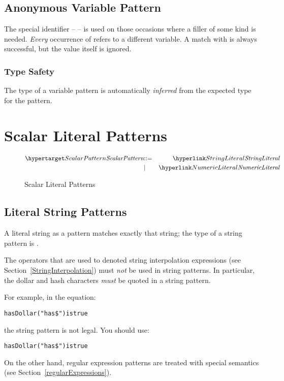 \subsection{Anonymous Variable Pattern}
\label{anonymousVariable}
The special identifier -- \q{\_} -- is used on those occasions where a filler of some kind is needed. \emph{Every} occurrence of \q{\_} refers to a different variable. A match with \q{\_} is always successful, but the value itself is ignored.

\subsubsection{Type Safety}
The type of a variable pattern is automatically \emph{inferred} from the expected type for the pattern.

\section{Scalar Literal Patterns}
\label{scalarPatterns}

\begin{figure}[htbp]
\begin{eqnarray*}
\ntDef{ScalarPattern}&\arrow&\ntRef{StringLiteral}\\
&\choice&\ntRef{NumericLiteral}
\end{eqnarray*}
\caption{Scalar Literal Patterns}
\label{scalarLiteralPtnFig}
\end{figure}


\subsection{Literal String Patterns}
\label{literalStringPattern}

A literal string as a pattern matches exactly that string; the type of a string pattern is .

\begin{aside}
The operators that are used to denoted string interpolation expressions (see Section~\vref{StringInterpolation}) must \emph{not} be used in string patterns. In particular, the dollar and hash characters \emph{must} be quoted in a string pattern.

For example, in the equation:
\begin{alltt}
hasDollar("has\$") is true
\end{alltt}
the string pattern  is not legal. You should use:
\begin{alltt}
hasDollar("has\bsl\$") is true
\end{alltt}

On the other hand, regular expression patterns are treated with special semantics (see Section~\vref{regularExpressions}).
\end{aside}

